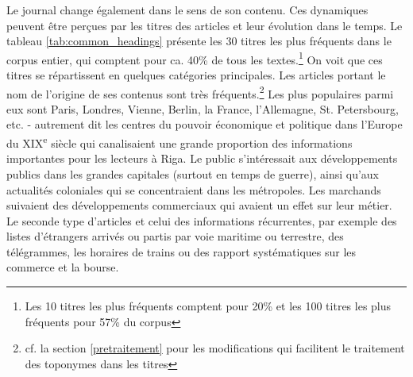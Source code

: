\documentclass[a4paper,twoside,12pt]{article}
\begin{document}
Le journal change également dans le sens de son contenu. Ces dynamiques peuvent être perçues par les titres des articles et leur évolution dans le temps. Le tableau \ref{tab:common_headings} présente les 30 titres les plus fréquents dans le corpus entier, qui comptent pour ca. 40\% de tous les textes.\footnote{Les 10 titres les plus fréquents comptent pour 20\% et les 100 titres les plus fréquents pour 57\% du corpus} On voit que ces titres se répartissent en quelques catégories principales. Les articles portant le nom de l'origine de ses contenus sont très fréquents.\footnote{cf. la section \ref{pretraitement} pour les modifications qui facilitent le traitement des toponymes dans les titres} Les plus populaires parmi eux sont Paris, Londres, Vienne, Berlin, la France, l'Allemagne, St. Petersbourg, etc. - autrement dit les centres du pouvoir économique et politique dans l'Europe du XIX\textsuperscript{e} siècle qui canalisaient une grande proportion des informations importantes pour les lecteurs à Riga. Le public s'intéressait aux développements publics dans les grandes capitales (surtout en temps de guerre), ainsi qu'aux actualités coloniales qui se concentraient dans les métropoles. Les marchands suivaient des développements commerciaux qui avaient un effet sur leur métier. Le seconde type d'articles et celui des informations récurrentes, par exemple des listes d'étrangers arrivés ou partis par voie maritime ou terrestre, des télégrammes, les horaires de trains ou des rapport systématiques sur les commerce et la bourse.
\end{document}
